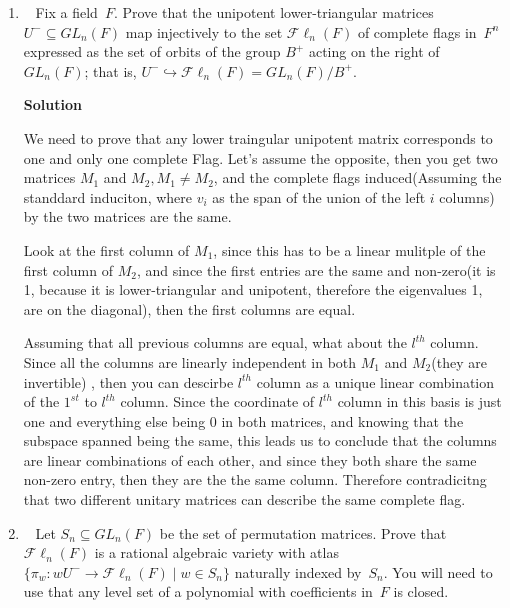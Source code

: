 \documentclass[11pt]{article}
\newcommand\score[1]{\marginpar{\vspace{-2ex}\color{blue}{#1/3}}\hspace{-1ex}}
\newcommand\0{\mathbf{0}}
\newcommand\GL{\mathit{GL}}
\newcommand\FL{{\mathcal F}{\ell}_n}
\newcommand\into{\hookrightarrow}
\newcommand\<{\langle}
\renewcommand\>{\rangle}
\begin{document}
\begin{enumerate}
The transition functions are $\pi_{1} \circ \pi_{2}^{-1}$ 
and $\pi_{2} \circ \pi_{1}^{-1}$, This functions are differeniable, so it is 
a smooth manifold. I don't know what a rational algebraic variety is, but since the 
transition functions are rational I suppose it is a rational algebraic variety.

\item\ \score{}%
Fix a field~$F$.  Prove that the unipotent lower-triangular matrices
$U^- \subseteq \GL_n(F)$ map injectively to the set $\FL(F)$ of
complete flags in~$F^n$ expressed as the set of orbits of the group
$B^+$ acting on the right of~$\GL_n(F)$; that is, $U^- \into \FL(F) =
\GL_n(F)/B^+$.

\textbf{Solution}

We need to prove that any lower traingular unipotent matrix corresponds
to one and only one complete Flag. Let's assume the opposite, then you get
two matrices $M_{1}$ and $M_{2}, M_{1}\neq M_{2}$, and the complete flags
induced(Assuming the standdard induciton, where $v_i$ as the span of the union 
of the left $i$ columns) by the two matrices are the same.

Look at the first column of $M_{1}$, since this has to be a linear mulitple
of the first column of $M_{2}$, and since the first entries are the same 
and non-zero(it is 1, because it is lower-triangular and unipotent, therefore
the eigenvalues 1, are on the diagonal), then the first columns are equal.

Assuming that all previous columns are equal, what about the $l^{th}$ column.
Since all the columns are linearly independent in both $M_1$ and $M_2$(they are invertible)
, then you can descirbe $l^{th}$ column as a unique linear combination of the 
$1^{st}$ to $l^{th}$ column. Since the coordinate of $l^{th}$ column in this basis is just one and everything
else being 0 in both matrices, and knowing that the subspace spanned being 
the same, this leads us to conclude that the columns are linear combinations
of each other, and since they both share the same non-zero entry, then they are the 
the same column. Therefore contradicitng that two different unitary matrices
can describe the same complete flag.

\item\ \score{}%
Let $S_n \subseteq \GL_n(F)$ be the set of permutation matrices.
Prove that $\FL(F)$ is a rational algebraic variety with atlas
$\{\pi_w: wU^- \to \FL(F) \mid w \in S_n\}$ naturally indexed
by~$S_n$.  You will need to use that any level set
of a polynomial with coefficients in~$F$ is closed.


\end{enumerate}
\end{document}
